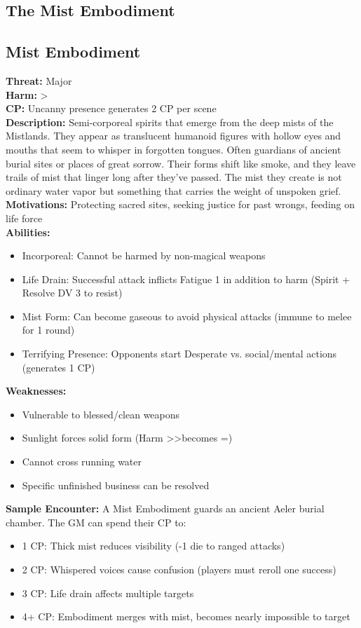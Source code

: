 \documentclass[11pt]{article}
\newenvironment{monsterentry}[1]{%
  \begin{mdframed}[backgroundcolor=shadecolor, linewidth=0pt, leftmargin=0pt, rightmargin=0pt]%
  \subsection*{#1}%
}{%
  \end{mdframed}%
}
\begin{document}
\subsection{The Mist Embodiment}

\begin{monsterentry}{Mist Embodiment}
\textbf{Threat:} Major \\
\textbf{Harm:} \textgreater \\
\textbf{CP:} Uncanny presence generates 2 CP per scene \\
\textbf{Description:} Semi-corporeal spirits that emerge from the deep mists of the Mistlands. They appear as translucent humanoid figures with hollow eyes and mouths that seem to whisper in forgotten tongues. Often guardians of ancient burial sites or places of great sorrow. Their forms shift like smoke, and they leave trails of mist that linger long after they've passed. The mist they create is not ordinary water vapor but something that carries the weight of unspoken grief. \\
\textbf{Motivations:} Protecting sacred sites, seeking justice for past wrongs, feeding on life force \\
\textbf{Abilities:}
\begin{itemize}
    \item Incorporeal: Cannot be harmed by non-magical weapons
    \item Life Drain: Successful attack inflicts Fatigue 1 in addition to harm (Spirit + Resolve DV 3 to resist)
    \item Mist Form: Can become gaseous to avoid physical attacks (immune to melee for 1 round)
    \item Terrifying Presence: Opponents start Desperate vs. social/mental actions (generates 1 CP)
\end{itemize}
\textbf{Weaknesses:}
\begin{itemize}
    \item Vulnerable to blessed/clean weapons
    \item Sunlight forces solid form (Harm \textgreater\textgreater becomes =)
    \item Cannot cross running water
    \item Specific unfinished business can be resolved
\end{itemize}
\textbf{Sample Encounter:} A Mist Embodiment guards an ancient Aeler burial chamber. The GM can spend their CP to:
\begin{itemize}
    \item 1 CP: Thick mist reduces visibility (-1 die to ranged attacks)
    \item 2 CP: Whispered voices cause confusion (players must reroll one success)
    \item 3 CP: Life drain affects multiple targets
    \item 4+ CP: Embodiment merges with mist, becomes nearly impossible to target
\end{itemize}
\end{monsterentry}
\end{document}
